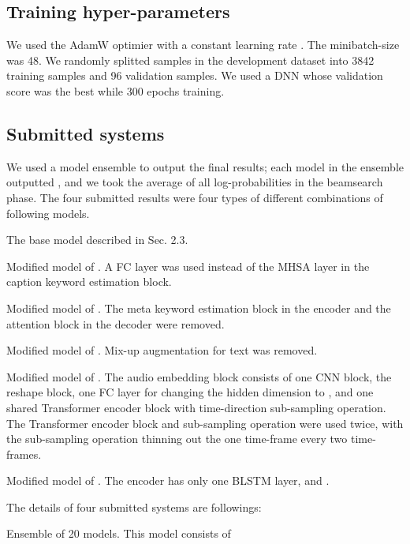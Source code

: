 \documentclass{article}
\begin{document}
\begin{sloppy}
\subsection{Training hyper-parameters}
We used the AdamW \cite{adamw} optimier with a constant learning rate . The minibatch-size was 48.
We randomly splitted  samples in the development dataset into 3842 training samples and 96 validation samples.
We used a DNN whose validation score was the best while 300 epochs training.




\subsection{Submitted systems}

We used a model ensemble to output the final results; each model in the ensemble outputted , and we took the average of all log-probabilities in the beamsearch phase.
The four submitted results were four types of different combinations of following models.
\begin{description}
 \setlength{\parskip}{0cm} 
 \setlength{\itemsep}{0.1cm} 
\item[] The base model described in Sec. 2.3.
\item[] Modified model of . A FC layer was used instead of the MHSA layer in the caption keyword estimation block.
\item[] Modified model of . The meta keyword estimation block in the encoder and the attention block in the decoder were removed.
\item[] Modified model of . Mix-up augmentation for text was removed.
\item[] Modified model of . The audio embedding block consists of 
one CNN block, the reshape block, one FC layer for changing the hidden dimension to , and one shared Transformer encoder block \cite{transformer} with time-direction sub-sampling operation. The Transformer encoder block and sub-sampling operation were used twice, with the sub-sampling operation thinning out the one time-frame every two time-frames. 
\item[] Modified model of . The encoder has only one BLSTM layer, and .
\end{description}
The details of four submitted systems are followings:
\begin{description}
 \setlength{\parskip}{0cm} 
 \setlength{\itemsep}{0.1cm} 
\item[Submission 1] Ensemble of 20 models. This model consists of

\end{description}
\end{sloppy}
\end{document}
